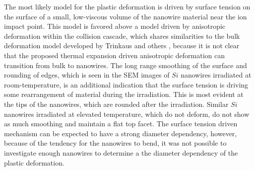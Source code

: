 The most likely model for the plastic deformation is driven by surface tension on the surface of a small, low-viscous volume of the nanowire material near the ion impact point. This model is favored above a model driven by anisotropic deformation within the collision cascade, which shares similarities to the bulk deformation model developed by Trinkaus and others \cite{trinkaus_viscoelastic_1995,baumer_prediction_2014}, because it is not clear that the proposed thermal expansion driven anisotropic deformation can transition from bulk to nanowires. The long range smoothing of the surface and rounding of edges, which is seen in the SEM images of $Si$ nanowires irradiated at room-temperature, is an additional indication that the surface tension is driving some rearrangement of material during the irradiation. This is most evident at the tips of the nanowires, which are rounded after the irradiation. Similar $Si$ nanowires irradiated at elevated temperature, which do not deform, do not show as much smoothing and maintain a flat top facet. The surface tension driven mechanism can be expected to have a strong diameter dependency, however, because of the tendency for the nanowires to bend, it was not possible to investigate enough nanowires to determine a the diameter dependency of the plastic deformation. 





